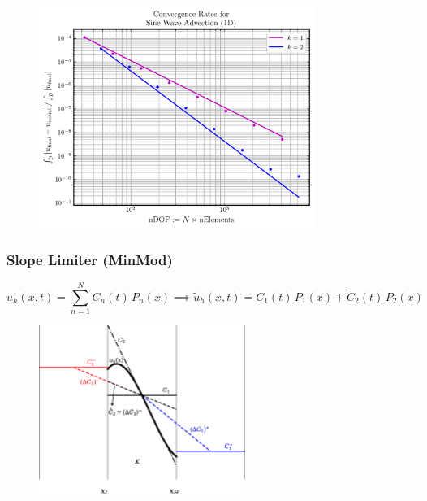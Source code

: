 \documentclass{beamer}
\begin{document}
\begin{frame}

  \begin{figure}[htb!]
    \centering
    \includegraphics[width=0.8\textwidth]{fig.ConvergenceRates.png}
  \end{figure}

\end{frame}

\begin{frame}
\frametitle{Slope Limiter (MinMod)}

  \Fontvi
  \begin{equation*}
  u_{h}\left(x,t\right)
  =\sum\limits_{n=1}^{N}
  C_{n}\left(t\right)\,P_{n}\left(x\right)\implies
  \tilde{u}_{h}\left(x,t\right)
  =C_{1}\left(t\right)\,P_{1}\left(x\right)
  +\tilde{C}_{2}\left(t\right)\,P_{2}\left(x\right)
  \end{equation*}

  \begin{figure}[htb!]
    \centering
    \includegraphics[width=0.6\textwidth]{fig.MinMod.jpeg}
  \end{figure}

\end{frame}
\end{document}
